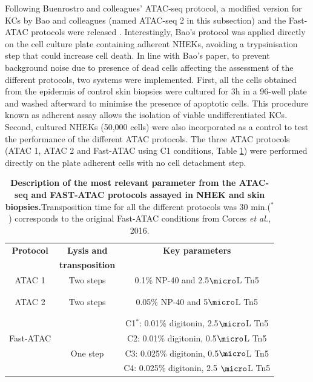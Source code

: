 Following Buenrostro and colleagues' ATAC-seq protocol, a modified version for KCs by Bao and colleagues (named ATAC-seq 2 in this subsection) and the Fast-ATAC protocols were released \parencite{Bao2015, Corces2016}. Interestingly, Bao's protocol was applied directly on the cell culture plate containing adherent NHEKs, avoiding a trypsinisation step that could increase cell death. In line with Bao's paper, to prevent background noise due to presence of dead cells affecting the assessment of the different protocols, two systems were implemented. First, all the cells obtained from the epidermis of control skin biopsies were cultured for 3h in a 96-well plate and washed afterward to minimise the presence of apoptotic cells. This procedure known as adherent assay allows the isolation of viable undifferentiated KCs. Second, cultured NHEKs (50,000 cells) were also incorporated as a control to test the performance of the different ATAC protocols. The three ATAC protocols (ATAC 1, ATAC 2 and Fast-ATAC using C1 conditions, Table \ref{tab:ATAC_skin_optimisation_protocols}) were performed directly on the plate adherent cells with no cell detachment step. 



\begin{table}[htbp]
\begin{tabular}{@{} c c c}
\toprule
\textbf{Protocol}   & \textbf{Lysis and} & \textbf{Key parameters} \\
                    & \textbf{transposition} &  \\
\midrule
\midrule
ATAC 1          & Two steps & 0.1\% NP-40 and 2.5$\micro$L Tn5  \\
\parencite{Buenrostro2013} && \\
&&\\
ATAC 2          &Two steps   & 0.05\% NP-40 and 5$\micro$L Tn5  \\
\parencite{Bao2015} &&\\
&&\\
                                 &             & C1$^\ast$: 0.01\% digitonin, 2.5$\micro$L Tn5 \\
 Fast-ATAC                       &             & C2: 0.01\% digitonin, 0.5$\micro$L Tn5 \\
\parencite{Corces2016}           & One step    & C3: 0.025\% digitonin, 0.5$\micro$L Tn5 \\
													       &             & C4: 0.025\% digitonin, 2.5 $\micro$L Tn5 \\
\bottomrule
\end{tabular}
\medskip %
\caption[Description of the most relevant parameter from the ATAC-seq and FAST-ATAC protocols assayed in NHEK and skin biopsies.]{\textbf{Description of the most relevant parameter from the ATAC-seq and FAST-ATAC protocols assayed in NHEK and skin biopsies.}Transposition time for all the different protocols was 30 min.($^\ast$) corresponds to the original Fast-ATAC conditions from Corces \textit{et al.}, 2016.}
\label{tab:ATAC_skin_optimisation_protocols}
\end{table}
\bigskip %

